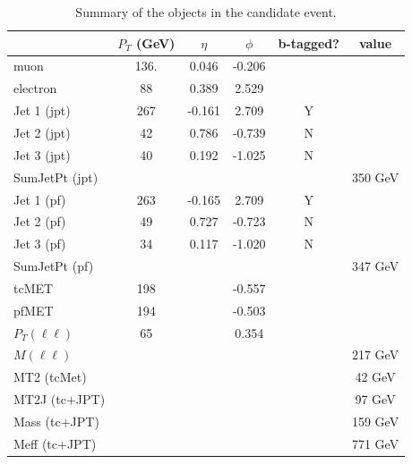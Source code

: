 \begin{table}[htb]
\begin{center}
\caption{\label{tab:cand1} Summary of the objects in the candidate event.}
\begin{tabular}{|l|c|c|c|c|c|}
\hline
               &  $P_T$ (GeV) & $\eta$  &  $\phi$  &  b-tagged? & value \\ \hline
muon           &   136.       &  0.046  &  -0.206  &            &       \\
electron       &    88        &  0.389  &   2.529  &            &       \\ \hline
Jet 1 (jpt)    &   267        & -0.161  &   2.709  &  Y         &       \\
Jet 2 (jpt)    &    42        &  0.786  &  -0.739  &  N         &       \\
Jet 3 (jpt)    &    40        &  0.192  &  -1.025  &  N         &       \\ 
SumJetPt (jpt) &              &         &          &            & 350 GeV   \\ \hline
Jet 1  (pf)    &   263        & -0.165  &   2.709  &  Y         &       \\
Jet 2  (pf)    &    49        &  0.727  &  -0.723  &  N         &       \\
Jet 3  (pf)    &    34        &  0.117  &  -1.020  &  N         &       \\ 
SumJetPt  (pf) &              &         &          &            & 347 GeV   \\ \hline
tcMET          &   198        &         &  -0.557  &            &       \\ 
pfMET          &   194        &         &  -0.503  &            &       \\ \hline
$P_T(\ell\ell)$&    65        &         &   0.354  &            &       \\
$M(\ell\ell)$  &              &         &          &            & 217 GeV \\
MT2 (tcMet)    &              &         &          &            & 42 GeV  \\
MT2J (tc$+$JPT)&              &         &          &            & 97 GeV  \\
Mass (tc$+$JPT)&              &         &          &            & 159 GeV \\
Meff (tc$+$JPT)&              &         &          &            & 771 GeV \\
\hline
\end{tabular}
\end{center}
\end{table}


